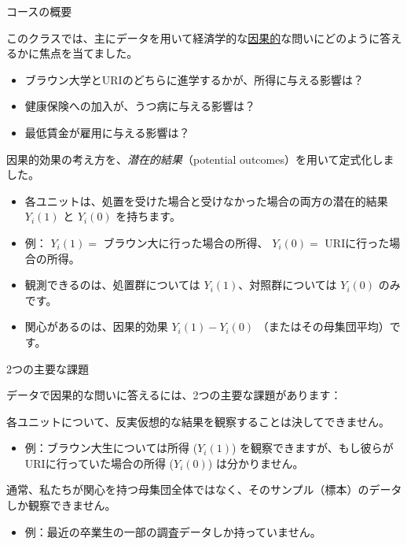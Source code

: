 \documentclass[11pt,handout]{beamer}
\newenvironment{wideitemizeshort}{\itemize}{\enditemize}
\begin{document}
\begin{frame}{コースの概要}
	\begin{wideitemizeshort}
		\item
		このクラスでは、主にデータを用いて経済学的な\underline{因果的}な問いにどのように答えるかに焦点を当てました。
			\begin{itemize}
				\item
				ブラウン大学とURIのどちらに進学するかが、所得に与える影響は？ 
				
				\item
				健康保険への加入が、うつ病に与える影響は？ 
				
				\item
				最低賃金が雇用に与える影響は？
			\end{itemize}
		
		\pause
		\item
		因果的効果の考え方を、\textit{潜在的結果}（potential outcomes）を用いて定式化しました。
			\begin{itemize}
				\item 
				各ユニットは、処置を受けた場合と受けなかった場合の両方の潜在的結果 $Y_i(1)$ と $Y_i(0)$ を持ちます。
				
				\item
				例： $Y_i(1) =$ ブラウン大に行った場合の所得、 $Y_i(0) =$ URIに行った場合の所得。
				
				\item
				観測できるのは、処置群については $Y_i(1)$、対照群については $Y_i(0)$ のみです。
				
				\item
				関心があるのは、因果的効果 $Y_i(1) - Y_i(0)$ （またはその母集団平均）です。
			\end{itemize}
	\end{wideitemizeshort}
\end{frame}

\begin{frame}{2つの主要な課題}

データで因果的な問いに答えるには、2つの主要な課題があります： \medskip 
	
	\begin{wideitemizeshort}
		\item
		各ユニットについて、反実仮想的な結果を観察することは決してできません。
			\begin{itemize}
				\item
				例：ブラウン大生については所得 ($Y_i(1)$) を観察できますが、もし彼らがURIに行っていた場合の所得 ($Y_i(0)$) は分かりません。
			\end{itemize} 
		
		\item
		通常、私たちが関心を持つ母集団全体ではなく、そのサンプル（標本）のデータしか観察できません。
		\begin{itemize}
			\item
			例：最近の卒業生の一部の調査データしか持っていません。
		\end{itemize}
	\end{wideitemizeshort}

\end{frame}
\end{document}
